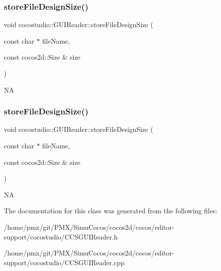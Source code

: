 \subsubsection{\texorpdfstring{store\+File\+Design\+Size()}{storeFileDesignSize()}\hspace{0.1cm}{\footnotesize\ttfamily [1/2]}}
{\footnotesize\ttfamily void cocostudio\+::\+G\+U\+I\+Reader\+::store\+File\+Design\+Size (\begin{DoxyParamCaption}\item[{const char $\ast$}]{file\+Name,  }\item[{const cocos2d\+::\+Size \&}]{size }\end{DoxyParamCaption})}

NA \mbox{\label{classcocostudio_1_1GUIReader_a2b5246b10e2a1af0171aa1caf108334b}} 
\subsubsection{\texorpdfstring{store\+File\+Design\+Size()}{storeFileDesignSize()}\hspace{0.1cm}{\footnotesize\ttfamily [2/2]}}
{\footnotesize\ttfamily void cocostudio\+::\+G\+U\+I\+Reader\+::store\+File\+Design\+Size (\begin{DoxyParamCaption}\item[{const char $\ast$}]{file\+Name,  }\item[{const cocos2d\+::\+Size \&}]{size }\end{DoxyParamCaption})}

NA 

The documentation for this class was generated from the following files\+:\begin{DoxyCompactItemize}
\item 
/home/pmx/git/\+P\+M\+X/\+Simu\+Cocos/cocos2d/cocos/editor-\/support/cocostudio/C\+C\+S\+G\+U\+I\+Reader.\+h\item 
/home/pmx/git/\+P\+M\+X/\+Simu\+Cocos/cocos2d/cocos/editor-\/support/cocostudio/C\+C\+S\+G\+U\+I\+Reader.\+cpp\end{DoxyCompactItemize}
